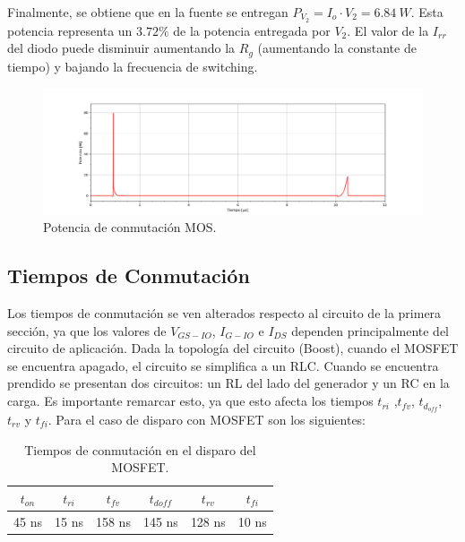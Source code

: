 Finalmente, se obtiene que en la fuente se entregan $P_{V_2}=I_o \cdot V_2 = 6.84 \ W$. Esta potencia representa un $3.72 \%$ de la potencia entregada por $V_2$.
El valor de la $I_{rr}$ del diodo puede disminuir aumentando la $R_g$ (aumentando la constante de tiempo) y bajando la frecuencia de switching. 
\begin{figure}[H]
	\centering
	\includegraphics[width=\linewidth]{ImagenesEjercicio-3/potencia-mos}
	\caption{Potencia de conmutación MOS.}
	\label{fig:ej3:conmutacionON_OFF_VDS_IDS_SWITCH_BOOST}
\end{figure}

\subsection{Tiempos de Conmutación}
Los tiempos de conmutación se ven alterados respecto al circuito de la primera sección, ya que los valores de $V_{GS-IO}$, $I_{G-IO}$ e $I_{DS}$ dependen principalmente del circuito de aplicación. Dada la topología del circuito (Boost), cuando el MOSFET se encuentra apagado, el circuito se simplifica a un RLC. Cuando se encuentra prendido se presentan dos circuitos: un RL del lado del generador y un RC en la carga. Es importante remarcar esto, ya que esto afecta los tiempos $t_{ri}$ ,$t_{fv}$, $t_{d_{off}}$, $t_{rv}$ y  $t_{fi}$. Para el caso de disparo con MOSFET son los siguientes:
\begin{table}[H]
\center
\begin{tabular}{cccccc}
\hline
$t_{on}$ & $t_{ri}$ & $t_{fv}$ & $t_{doff}$ & $t_{rv}$ & $t_{fi}$          \\	\hline
45 ns       & 15 ns       & 158 ns      & 145 ns        & 128 ns      & 10 ns     \\	 	\hline
\end{tabular}
\caption{Tiempos de conmutación en el disparo del MOSFET.}
\end{table}


